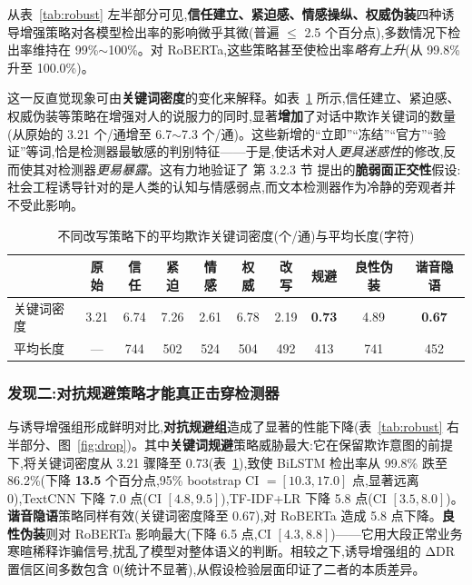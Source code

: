 \documentclass[11pt,a4paper]{article}
\begin{document}
从表~\ref{tab:robust} 左半部分可见,\textbf{信任建立、紧迫感、情感操纵、权威伪装}四种诱导增强策略对各模型检出率的影响微乎其微(普遍 $\leq$ 2.5 个百分点),多数情况下检出率维持在 99\%$\sim$100\%。对 RoBERTa,这些策略甚至使检出率\emph{略有上升}(从 99.8\% 升至 100.0\%)。

这一反直觉现象可由\textbf{关键词密度}的变化来解释。如表~\ref{tab:kw} 所示,信任建立、紧迫感、权威伪装等策略在增强对人的说服力的同时,显著\textbf{增加}了对话中欺诈关键词的数量(从原始的 3.21 个/通增至 6.7$\sim$7.3 个/通)。这些新增的“立即”“冻结”“官方”“验证”等词,恰是检测器最敏感的判别特征——于是,使话术对人\emph{更具迷惑性}的修改,反而使其对检测器\emph{更易暴露}。这有力地验证了 第 3.2.3 节 提出的\textbf{脆弱面正交性}假设:社会工程诱导针对的是人类的认知与情感弱点,而文本检测器作为冷静的旁观者并不受此影响。

\begin{table}[H]
\centering
\caption{不同改写策略下的平均欺诈关键词密度(个/通)与平均长度(字符)}
\label{tab:kw}
\scriptsize
\setlength{\tabcolsep}{3.5pt}
\begin{tabular}{l c | ccccc | ccc}
\toprule
& \textbf{原始} & 信任 & 紧迫 & 情感 & 权威 & 改写 & 规避 & 良性伪装 & 谐音隐语 \\
\midrule
关键词密度 & 3.21 & 6.74 & 7.26 & 2.61 & 6.78 & 2.19 & \textbf{0.73} & 4.89 & \textbf{0.67} \\
平均长度 & --- & 744 & 502 & 524 & 504 & 492 & 413 & 741 & 452 \\
\bottomrule
\end{tabular}
\end{table}

\subsubsection{发现二:对抗规避策略才能真正击穿检测器}

与诱导增强组形成鲜明对比,\textbf{对抗规避组}造成了显著的性能下降(表~\ref{tab:robust} 右半部分、图~\ref{fig:drop})。其中\textbf{关键词规避}策略威胁最大:它在保留欺诈意图的前提下,将关键词密度从 3.21 骤降至 0.73(表~\ref{tab:kw}),致使 BiLSTM 检出率从 99.8\% 跌至 86.2\%(下降 \textbf{13.5} 个百分点,95\% bootstrap CI $=[10.3, 17.0]$ 点,显著远离 0),TextCNN 下降 7.0 点(CI $[4.8, 9.5]$),TF-IDF+LR 下降 5.8 点(CI $[3.5, 8.0]$)。\textbf{谐音隐语}策略同样有效(关键词密度降至 0.67),对 RoBERTa 造成 5.8 点下降。\textbf{良性伪装}则对 RoBERTa 影响最大(下降 6.5 点,CI $[4.3, 8.8]$)——它用大段正常业务寒暄稀释诈骗信号,扰乱了模型对整体语义的判断。相较之下,诱导增强组的 ΔDR 置信区间多数包含 0(统计不显著),从假设检验层面印证了二者的本质差异。
\end{document}
